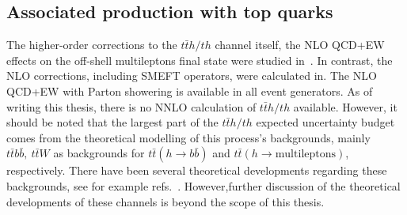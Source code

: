 \subsection{Associated production with top quarks}
\par The higher-order corrections to the $t\bar t h /t h$ channel itself, the NLO QCD+EW effects on the off-shell multileptons final state were studied in~\cite{Denner:2019zdz}. In contrast, the NLO corrections, including SMEFT operators, were calculated in\cite{Maltoni:2016yxb}. The NLO QCD+EW with Parton showering is available in all event generators. As of writing this thesis, there is no NNLO calculation of $t\bar t h /t h$ available. 
However, it should be noted that the largest part of the $t\bar t h/th$ expected uncertainty budget comes from the theoretical modelling of this process's backgrounds, mainly $t \bar t b\bar b,\ t\bar t W$ as backgrounds for $ t\bar t (h \to b\bar b)$ and $ t \bar t ( h \to \mathrm{multileptons})$, respectively. There have been several theoretical developments regarding these backgrounds, see for example refs.~\cite{Broggio:2019ewu,Kulesza:2020nfh,Bevilacqua:2020pzy,Denner:2020hgg,Bevilacqua:2020srb,Denner:2021hqi,Bevilacqua:2021tzp,Denner:2020orv, Bevilacqua:2021cit}. However,further discussion of the theoretical developments of these channels is beyond the scope of this thesis.


